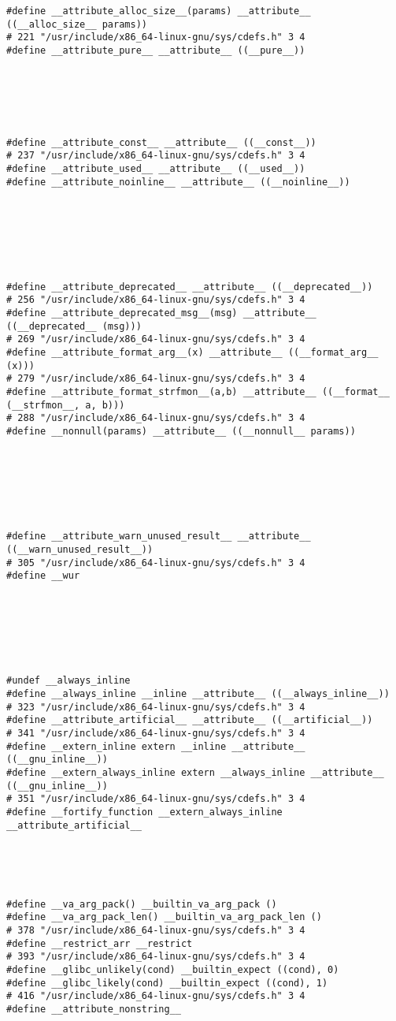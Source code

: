 \documentclass[11pt]{article}
\begin{document}
\begin{enumerate}
\begin{verbatim}
#define __attribute_alloc_size__(params) __attribute__ ((__alloc_size__ params))
# 221 "/usr/include/x86_64-linux-gnu/sys/cdefs.h" 3 4
#define __attribute_pure__ __attribute__ ((__pure__))






#define __attribute_const__ __attribute__ ((__const__))
# 237 "/usr/include/x86_64-linux-gnu/sys/cdefs.h" 3 4
#define __attribute_used__ __attribute__ ((__used__))
#define __attribute_noinline__ __attribute__ ((__noinline__))







#define __attribute_deprecated__ __attribute__ ((__deprecated__))
# 256 "/usr/include/x86_64-linux-gnu/sys/cdefs.h" 3 4
#define __attribute_deprecated_msg__(msg) __attribute__ ((__deprecated__ (msg)))
# 269 "/usr/include/x86_64-linux-gnu/sys/cdefs.h" 3 4
#define __attribute_format_arg__(x) __attribute__ ((__format_arg__ (x)))
# 279 "/usr/include/x86_64-linux-gnu/sys/cdefs.h" 3 4
#define __attribute_format_strfmon__(a,b) __attribute__ ((__format__ (__strfmon__, a, b)))
# 288 "/usr/include/x86_64-linux-gnu/sys/cdefs.h" 3 4
#define __nonnull(params) __attribute__ ((__nonnull__ params))







#define __attribute_warn_unused_result__ __attribute__ ((__warn_unused_result__))
# 305 "/usr/include/x86_64-linux-gnu/sys/cdefs.h" 3 4
#define __wur 







#undef __always_inline
#define __always_inline __inline __attribute__ ((__always_inline__))
# 323 "/usr/include/x86_64-linux-gnu/sys/cdefs.h" 3 4
#define __attribute_artificial__ __attribute__ ((__artificial__))
# 341 "/usr/include/x86_64-linux-gnu/sys/cdefs.h" 3 4
#define __extern_inline extern __inline __attribute__ ((__gnu_inline__))
#define __extern_always_inline extern __always_inline __attribute__ ((__gnu_inline__))
# 351 "/usr/include/x86_64-linux-gnu/sys/cdefs.h" 3 4
#define __fortify_function __extern_always_inline __attribute_artificial__





#define __va_arg_pack() __builtin_va_arg_pack ()
#define __va_arg_pack_len() __builtin_va_arg_pack_len ()
# 378 "/usr/include/x86_64-linux-gnu/sys/cdefs.h" 3 4
#define __restrict_arr __restrict
# 393 "/usr/include/x86_64-linux-gnu/sys/cdefs.h" 3 4
#define __glibc_unlikely(cond) __builtin_expect ((cond), 0)
#define __glibc_likely(cond) __builtin_expect ((cond), 1)
# 416 "/usr/include/x86_64-linux-gnu/sys/cdefs.h" 3 4
#define __attribute_nonstring__ 






\end{verbatim}
\end{enumerate}
\end{document}
